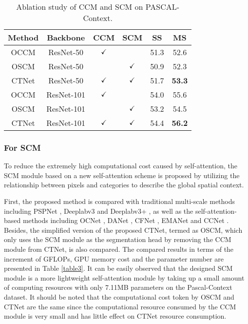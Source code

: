 \documentclass[10pt,journal,cspaper,compsoc]{IEEEtran}
\begin{document}
\begin{table}[t]
\caption{Ablation study of CCM and SCM on PASCAL-Context.}
	\label{table5}
		\renewcommand\arraystretch{1.3}
		\centering
		\begin{tabular}{c|c|c|c|c|c}
			\hline
			Method & Backbone &CCM & SCM&SS &MS\\
			\hline
			OCCM&ResNet-50  & $\textbf{\checkmark}$& &51.3 &52.6\\
			OSCM&ResNet-50& & $\textbf{\checkmark}$& 50.9&52.3\\
			CTNet&ResNet-50& $\textbf{\checkmark}$&$\textbf{\checkmark}$&51.7&\textbf{53.3}\\
			\hline
			OCCM&ResNet-101  & $\textbf{\checkmark}$& &54.0 & 55.6\\
			OSCM&ResNet-101& & $\textbf{\checkmark}$& 53.2 & 54.5\\
			CTNet&ResNet-101& $\textbf{\checkmark}$&$\textbf{\checkmark}$&54.4&\textbf{56.2}\\
			\hline
	\end{tabular}
\end{table}
	
\subsubsection{For SCM}
To reduce the extremely high computational cost caused by self-attention, the SCM module based on a new self-attention scheme is proposed by utilizing the relationship between pixels and categories to describe the global spatial context.
	
First, the proposed method is compared with traditional multi-scale methods including PSPNet \cite{zhao2017pyramid}, Deeplabv3 \cite{chen2017rethinking} and Deeplabv3+ \cite{chen2018encoder}, as well as the self-attention-based methods including OCNet \cite{yu2020context}, DANet \cite{fu2019dual}, CFNet \cite{zhang2019co}, EMANet \cite{li2019expectation} and CCNet \cite{huang2019ccnet}. Besides, the simplified version of the proposed CTNet, termed as OSCM, which only uses the SCM module as the segmentation head by removing the CCM module from CTNet, is also compared. The compared results in terms of the increment of GFLOPs, GPU memory cost and the parameter number are presented in Table \ref{table3}. It can be easily observed that the designed SCM module is a more lightweight self-attention module by taking up a small amount of computing resources with only 7.11MB parameters on the Pascal-Context dataset. It should be noted that the computational cost token by OSCM and CTNet are the same since the computational resource consumed by the CCM module is very small and has little effect on CTNet resource consumption.
	
\end{document}
